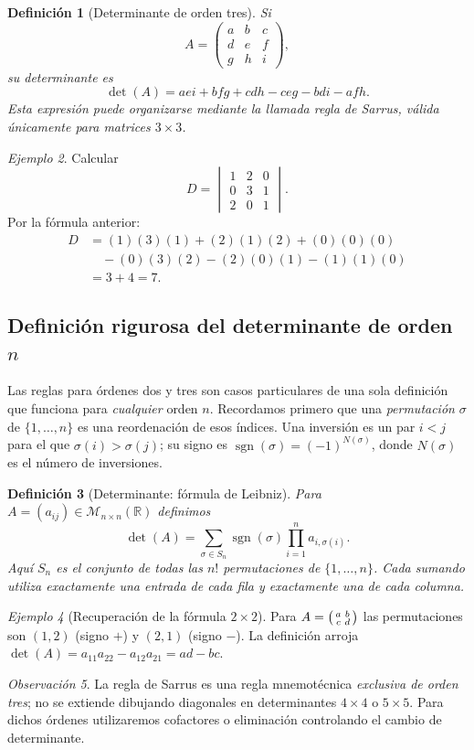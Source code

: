 \documentclass[12pt]{article}
\newtheorem{definicion}{Definición}[section]
\theoremstyle{remark}
\newtheorem{observacion}[definicion]{Observación}
\newtheorem{ejemplo}[definicion]{Ejemplo}
\newcommand{\R}{\mathbb{R}}
\newcommand{\Mat}[2]{\mathcal{M}_{#1\times #2}}
\begin{document}
\begin{definicion}[Determinante de orden tres]
Si
\[
A=\begin{pmatrix}a&b&c\\d&e&f\\g&h&i\end{pmatrix},
\]
su determinante es
\[
\boxed{\det(A)=aei+bfg+cdh-ceg-bdi-afh.}
\]
Esta expresión puede organizarse mediante la llamada \emph{regla de Sarrus}, válida únicamente para matrices $3\times3$.
\end{definicion}

\begin{ejemplo}
Calcular
\[
D=\begin{vmatrix}1&2&0\\0&3&1\\2&0&1\end{vmatrix}.
\]
Por la fórmula anterior:
\begin{align*}
D&=(1)(3)(1)+(2)(1)(2)+(0)(0)(0)\\
&\quad -(0)(3)(2)-(2)(0)(1)-(1)(1)(0)\\
&=3+4=\boxed{7}.
\end{align*}
\end{ejemplo}

\subsection{Definición rigurosa del determinante de orden $n$}
Las reglas para órdenes dos y tres son casos particulares de una sola definición que funciona para \emph{cualquier} orden $n$. Recordamos primero que una \emph{permutación} $\sigma$ de $\{1,\ldots,n\}$ es una reordenación de esos índices. Una inversión es un par $i<j$ para el que $\sigma(i)>\sigma(j)$; su signo es $\operatorname{sgn}(\sigma)=(-1)^{N(\sigma)}$, donde $N(\sigma)$ es el número de inversiones.
\begin{definicion}[Determinante: fórmula de Leibniz]
Para $A=(a_{ij})\in\Mat{n}{n}(\R)$ definimos
\[
\boxed{\det(A)=\sum_{\sigma\in S_n}\operatorname{sgn}(\sigma)\prod_{i=1}^{n}a_{i,\sigma(i)}.}
\]
Aquí $S_n$ es el conjunto de todas las $n!$ permutaciones de $\{1,\ldots,n\}$. Cada sumando utiliza exactamente una entrada de cada fila y exactamente una de cada columna.
\end{definicion}
\begin{ejemplo}[Recuperación de la fórmula $2\times2$]
Para $A=\begin{psmallmatrix}a&b\\c&d\end{psmallmatrix}$ las permutaciones son $(1,2)$ (signo $+$) y $(2,1)$ (signo $-$). La definición arroja $\det(A)=a_{11}a_{22}-a_{12}a_{21}=ad-bc$.
\end{ejemplo}
\begin{observacion}
La regla de Sarrus es una regla mnemotécnica \emph{exclusiva de orden tres}; no se extiende dibujando diagonales en determinantes $4\times4$ o $5\times5$. Para dichos órdenes utilizaremos cofactores o eliminación controlando el cambio de determinante.
\end{observacion}
\end{document}
